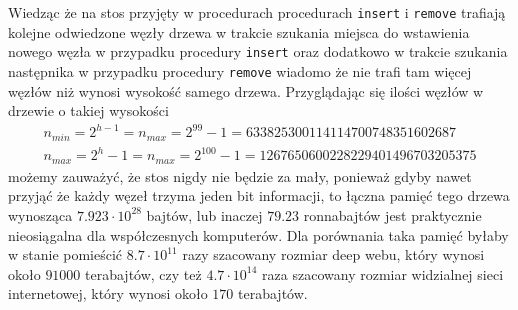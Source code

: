 \documentclass{article}
\begin{document}
\noindent
Wiedząc że na stos przyjęty w procedurach procedurach \verb+insert+ i \verb+remove+ trafiają kolejne odwiedzone węzły
drzewa w trakcie szukania miejsca do wstawienia nowego węzła w przypadku procedury \verb+insert+ oraz dodatkowo
w trakcie szukania następnika w przypadku procedury \verb+remove+ wiadomo że nie trafi tam więcej węzłów niż wynosi
wysokość samego drzewa. Przyglądając się ilości węzłów w drzewie o takiej wysokości
\begin{gather*}
    n_{min} = 2^{h-1} = n_{max} = 2^{99} - 1 = 633825300114114700748351602687 \\
    n_{max} = 2^h - 1 = n_{max} = 2^{100} - 1 = 1267650600228229401496703205375
\end{gather*}
możemy zauważyć, że stos nigdy nie będzie za mały, ponieważ gdyby nawet przyjąć że każdy węzeł trzyma jeden bit
informacji, to łączna pamięć tego drzewa wynosząca $7.923 \cdot 10^{28}$ bajtów, lub inaczej $79.23$ ronnabajtów jest
praktycznie nieosiągalna dla współczesnych komputerów. Dla porównania taka pamięć byłaby w stanie pomieścić
$8.7 \cdot 10^{11}$ razy szacowany rozmiar deep webu, który wynosi około $91000$ terabajtów, czy też $4.7 \cdot 10^{14}$
raza szacowany rozmiar widzialnej sieci internetowej, który wynosi około $170$ terabajtów.
\end{document}
